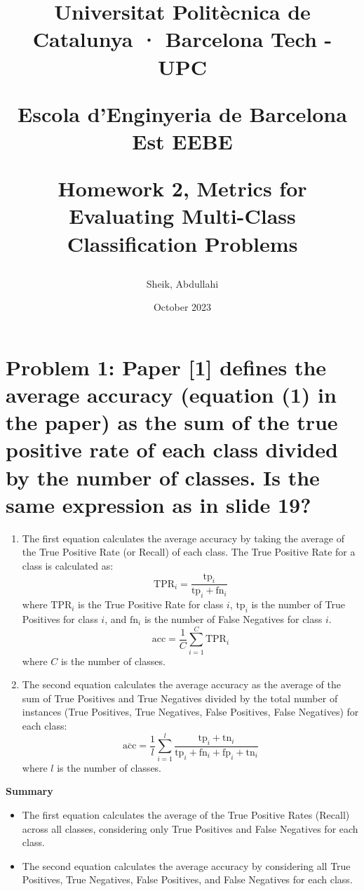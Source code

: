 \documentclass{article}
\begin{document}
\title{Universitat Politècnica de Catalunya · Barcelona Tech - UPC

Escola d'Enginyeria de Barcelona Est EEBE

Homework 2, Metrics for Evaluating Multi-Class Classification Problems}
\author{Sheik, Abdullahi}
\date{October 2023}
\maketitle


\section*{Problem 1: Paper [1] defines the average accuracy (equation (1) in the paper) as the sum of the true
positive rate of each class divided by the number of classes. Is the same expression as in
slide 19?}

\begin{enumerate}
    \item The first equation calculates the average accuracy by taking the average of the True Positive Rate (or Recall) of each class. The True Positive Rate for a class is calculated as:
    \begin{equation}
        \text{TPR}_i = \frac{\text{tp}_i}{\text{tp}_i + \text{fn}_i}
    \end{equation}
    where \( \text{TPR}_i \) is the True Positive Rate for class \( i \), \( \text{tp}_i \) is the number of True Positives for class \( i \), and \( \text{fn}_i \) is the number of False Negatives for class \( i \).
    \begin{equation}
        \text{acc} = \frac{1}{C} \sum_{i=1}^{C} \text{TPR}_i
    \end{equation}
    where \( C \) is the number of classes.
    
    \item The second equation calculates the average accuracy as the average of the sum of True Positives and True Negatives divided by the total number of instances (True Positives, True Negatives, False Positives, False Negatives) for each class:
    \begin{equation}
        \overline{\text{acc}} = \frac{1}{l} \sum_{i=1}^{l} \frac{\text{tp}_i + \text{tn}_i}{\text{tp}_i + \text{fn}_i + \text{fp}_i + \text{tn}_i}
    \end{equation}
    where \( l \) is the number of classes.
\end{enumerate}

\textbf{Summary}
\begin{itemize}
    \item The first equation calculates the average of the True Positive Rates (Recall) across all classes, considering only True Positives and False Negatives for each class.
    \item The second equation calculates the average accuracy by considering all True Positives, True Negatives, False Positives, and False Negatives for each class.
\end{itemize}
\end{document}
